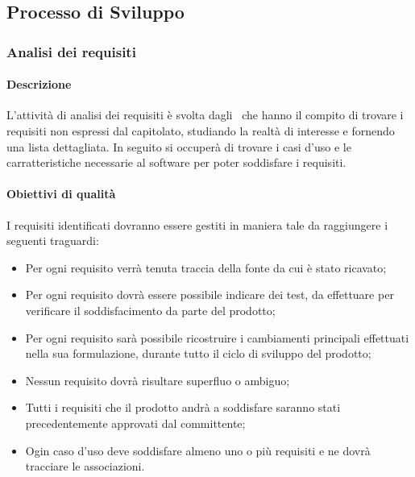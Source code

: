 \documentclass[../NormeDiProgetto_v3.0.0.tex]{subfiles}
\begin{document}
	\subsection{Processo di Sviluppo}
		\subsubsection{Analisi dei requisiti}
			\paragraph{Descrizione}
			L'attività di analisi dei requisiti è svolta dagli \analisti\ che hanno il compito di trovare i requisiti non espressi dal capitolato, studiando la realtà di interesse e fornendo una lista dettagliata.
			In seguito si occuperà di trovare i casi d'uso e le carratteristiche necessarie al software per poter soddisfare i requisiti.

 			\paragraph{Obiettivi di qualità}
				I requisiti identificati dovranno essere gestiti in maniera tale da raggiungere i seguenti traguardi:
				\begin{itemize}
					\item Per ogni requisito verrà tenuta traccia della fonte da cui è stato ricavato;
					\item Per ogni requisito dovrà essere possibile indicare dei test, da effettuare per verificare il soddisfacimento da parte del prodotto;
					\item Per ogni requisito sarà possibile ricostruire i cambiamenti principali effettuati nella sua formulazione, durante tutto il ciclo di sviluppo del prodotto;
					\item Nessun requisito dovrà risultare superfluo o ambiguo;
					\item Tutti i requisiti che il prodotto andrà a soddisfare saranno stati precedentemente approvati dal committente;
					\item Ogin caso d'uso deve soddisfare almeno uno o più requisiti e ne dovrà tracciare le associazioni.
				\end{itemize}
\end{document}
